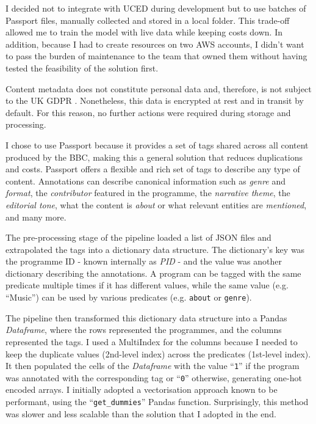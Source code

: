 
I decided not to integrate with UCED during development but to use batches of Passport files,
manually collected and stored in a local folder.
This trade-off allowed me to train the model with live data while keeping costs down.
In addition, because I had to create resources on two AWS accounts,
I didn't want to pass the burden of maintenance to the team that owned them without having tested the feasibility of the solution first.


Content metadata does not constitute personal data and, therefore, is not subject to the UK GDPR  \cite{UKGDPR}.
Nonetheless, this data is encrypted at rest and in transit by default.
For this reason, no further actions were required during storage and processing.


I chose to use Passport because it provides a set of tags shared across all content produced by the BBC,
making this a general solution that reduces duplications and costs.
Passport offers a flexible and rich set of tags to describe any type of content.
Annotations can describe canonical information such as \textit{genre} and \textit{format},
the \textit{contributor} featured in the programme, the \textit{narrative theme}, the \textit{editorial tone},
what the content is \textit{about} or what relevant entities are \textit{mentioned}, and many more.


The pre-processing stage of the pipeline loaded a list of JSON files and extrapolated the tags into a dictionary data structure.
The dictionary's key was the programme ID - known internally as \textit{PID} - and the value was another dictionary describing the annotations.
A program can be tagged with the same predicate multiple times if it has different values,
while the same value (e.g. ``Music'') can be used by various predicates (e.g. \verb|about| or \verb|genre|).

The pipeline then transformed this dictionary data structure into a Pandas \textit{Dataframe},
where the rows represented the programmes, and the columns represented the tags.
I used a MultiIndex \cite{Pandas:MultiIndex} for the columns because I needed to keep the duplicate values (2nd-level index) across the predicates
(1st-level index).
It then populated the cells of the \textit{Dataframe} with the value ``\verb|1|''
if the program was annotated with the corresponding tag or ``\verb|0|'' otherwise, generating one-hot encoded arrays.
I initially adopted a vectorisation approach known to be performant, using the ``\verb|get_dummies|'' Pandas function.
Surprisingly, this method was slower and less scalable than the solution that I adopted in the end.

